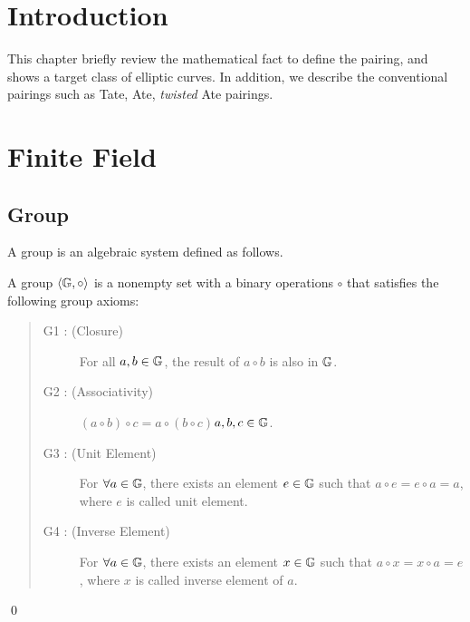 \section{Introduction}

This chapter briefly review the mathematical fact to define the pairing, and shows a target class of elliptic curves.
In addition, we describe the conventional pairings such as Tate, Ate, {\it twisted} Ate pairings.

\section{Finite Field}

\subsection{Group}\label{group}
A group is an algebraic system defined as follows.
\begin{definition}
A group $\langle \mathbb{G}\index{group},\circ\rangle$ is a nonempty set with a binary operations $\circ$ that satisfies the following group axioms:
\begin{quote}\begin{description}
\item[G1 : (Closure)] For all $a, b \in \mathbb{G}\index{group}$, the result of $a\circ b$ is also in $\mathbb{G}\index{group}$.
\item[G2 : (Associativity)] $(a\circ b)\circ c=a\circ (b\circ c)$\hspace{2em}$a,b,c\in\mathbb{G}\index{group}$.
\item[G3 : (Unit Element)] For $\forall a \in\mathbb{G}\index{group}$, there exists an element $e\in\mathbb{G}\index{group}$ such that $a\circ e=e\circ a=a$, where $e$ is called unit element.
\item[G4 : (Inverse Element)] For ${\forall}a \in\mathbb{G}\index{group}$, there exists an element $x\in\mathbb{G}\index{group}$ such that $a\circ x=x\circ a=e$, where $x$ is called inverse element of $a$.
\end{description}\end{quote}
\qed
\end{definition}

